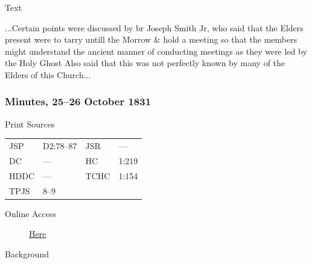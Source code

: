 {			\begin{description}
				\item[Text]
			\end{description}
			
				...Certain points were discussed by br Joseph Smith Jr, who said that the Elders present were to tarry untill the Morrow \& hold a meeting so that the members might understand the ancient manner of conducting meetings as they were led by the Holy Ghost Also said that this was not perfectly known by many of the Elders of this Church...
				
		\subsubsection{Minutes, 25--26 October 1831}
			\label{EMS-1831-JS-25-26-OCT-1831}
		
			\begin{description}
				\item[Print Sources]
			\end{description}

				\begin{tabular}{p{0.5in}p{1in}p{0.5in}p{1in}}
				JSP	 	& D2:78--87		& JSR 		& --- \\
				DC	 	& ---		 	& HC 		& 1:219 \\
				HDDC 	& ---			& TCHC 		& 1:154 \\
				TPJS 	& 8--9			& 	 		&  \\
				\end{tabular}
			
			\begin{description}
				\item[Online Access] \href{https://www.josephsmithpapers.org/paper-summary/minutes-25-26-october-1831/1}{Here}
			\end{description}
			
			\begin{description}
				\item[Background]
			\end{description}
			
			
}
